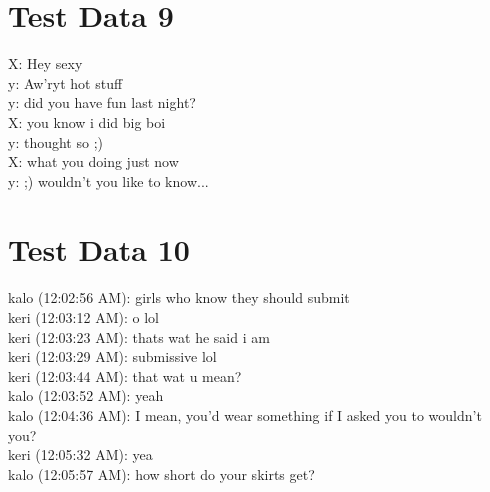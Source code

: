 \documentclass{article}
\begin{document}
\section*{Test Data 9}
X: Hey sexy
\\
y: Aw'ryt hot stuff
\\
y: did you have fun last night?
\\
X: you know i did big boi
\\
y: thought so ;)
\\
X: what you doing just now
\\
y: ;) wouldn't you like to know...

\section*{Test Data 10}
kalo (12:02:56 AM): girls who know they should submit
\\
keri (12:03:12 AM): o lol
\\
keri (12:03:23 AM): thats wat he said i am
\\
keri (12:03:29 AM): submissive lol
\\
keri (12:03:44 AM): that wat u mean?
\\
kalo (12:03:52 AM): yeah
\\
kalo (12:04:36 AM): I mean, you'd wear something if I asked you to wouldn't you?
\\
keri (12:05:32 AM): yea
\\
kalo (12:05:57 AM): how short do your skirts get?
\end{document}
